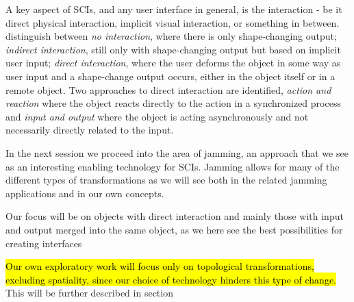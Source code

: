 A key aspect of SCIs, and any user interface in general, is the interaction - be it direct physical interaction, implicit visual interaction, or something in between. 
\citeauthor{rasmussen2012shape} distinguish between \textit{no interaction}, where there is only shape-changing output; \textit{indirect interaction}, still only with shape-changing output but based on implicit user input; \textit{direct interaction}, where the user deforms the object in some way as user input and a shape-change output occurs, either in the object itself or in a remote object.
Two approaches to direct interaction are identified, \textit{action and reaction} where the object reacts directly to the action in a synchronized process and \textit{input and output} where the object is acting asynchronously and not necessarily directly related to the input.

In the next session we proceed into the area of jamming, an approach that we see as an interesting enabling technology for SCIs.
Jamming allows for many of the different types of transformations as we will see both in the related jamming applications and in our own concepts. 

Our focus will be on objects with direct interaction and mainly those with input and output merged into the same object, as we here see the best possibilities for creating interfaces 
 
\hl{Our own exploratory work will focus only on topological transformations, excluding spatiality, since our choice of technology hinders this type of change.} This will be further described in section   